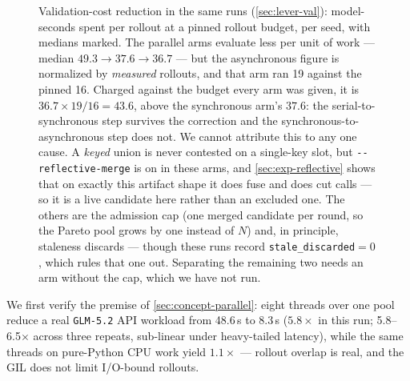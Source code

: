 \documentclass{article}
\newcommand{\code}[1]{\texttt{#1}}
\begin{document}
\begin{figure}[t]
\begin{minipage}[t]{0.32\textwidth}
\label{fig:concurrency}
\end{minipage}\hfill
\begin{minipage}[t]{0.32\textwidth}
\centering
{}
\caption{Validation-cost reduction in the same runs (\cref{sec:lever-val}): model-seconds spent per rollout at a pinned rollout budget, per seed, with medians marked. The parallel arms evaluate less per unit of work --- median $49.3 \to 37.6 \to 36.7$ --- but the asynchronous figure is normalized by \emph{measured} rollouts, and that arm ran 19 against the pinned 16. Charged against the budget every arm was given, it is $36.7 \times 19/16 = 43.6$, above the synchronous arm's $37.6$: the serial-to-synchronous step survives the correction and the synchronous-to-asynchronous step does not. We cannot attribute this to any one cause. A \emph{keyed} union is never contested on a single-key slot, but \code{-{}-reflective-merge} is on in these arms, and \cref{sec:exp-reflective} shows that on exactly this artifact shape it does fuse and does cut calls --- so it is a live candidate here rather than an excluded one. The others are the admission cap (one merged candidate per round, so the Pareto pool grows by one instead of $N$) and, in principle, staleness discards --- though these runs record \code{stale\_discarded}${=}0$, which rules that one out. Separating the remaining two needs an arm without the cap, which we have not run.}
\label{fig:mspr}
\end{minipage}
\end{figure}

We first verify the premise of \cref{sec:concept-parallel}: eight threads over one pool reduce a real \code{GLM-5.2} API workload from 48.6\,s to 8.3\,s ($5.8\times$ in this run; 5.8--6.5$\times$ across three repeats, sub-linear under heavy-tailed latency), while the same threads on pure-Python CPU work yield $1.1\times$ --- rollout overlap is real, and the GIL does not limit I/O-bound rollouts.
\end{document}

